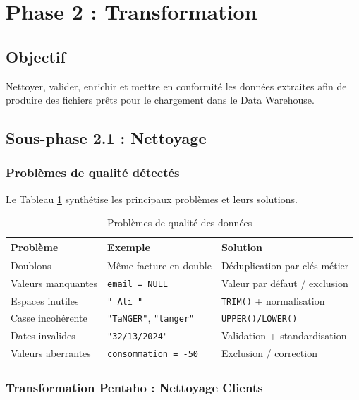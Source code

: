 \documentclass[12pt,a4paper]{report}
\begin{document}
\section{Phase 2 : Transformation}

\subsection{Objectif}

Nettoyer, valider, enrichir et mettre en conformité les données extraites afin de produire des fichiers prêts pour le chargement dans le Data Warehouse.

\subsection{Sous-phase 2.1 : Nettoyage}

\subsubsection{Problèmes de qualité détectés}

Le Tableau \ref{tab:problemes_qualite} synthétise les principaux problèmes et leurs solutions.

\begin{table}[H]
\centering
\caption{Problèmes de qualité des données}
\label{tab:problemes_qualite}
\begin{tabular}{|l|l|l|}
\hline
\textbf{Problème} & \textbf{Exemple} & \textbf{Solution} \\
\hline
Doublons & Même facture en double & Déduplication par clés métier \\
Valeurs manquantes & \texttt{email = NULL} & Valeur par défaut / exclusion \\
Espaces inutiles & \texttt{" Ali  "} & \texttt{TRIM()} + normalisation \\
Casse incohérente & \texttt{"TaNGER"}, \texttt{"tanger"} & \texttt{UPPER()/LOWER()} \\
Dates invalides & \texttt{"32/13/2024"} & Validation + standardisation \\
Valeurs aberrantes & \texttt{consommation = -50} & Exclusion / correction \\
\hline
\end{tabular}
\end{table}

\subsubsection{Transformation Pentaho : Nettoyage Clients}
\end{document}
